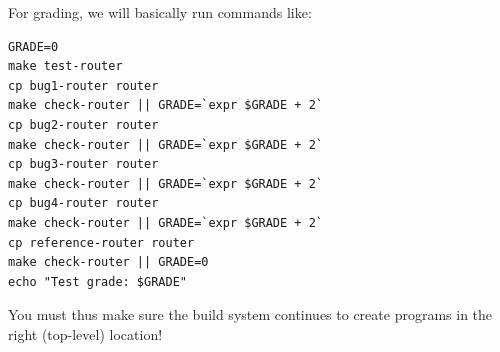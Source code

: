 \documentclass{article}
\begin{document}
For grading, we will basically run commands like:
\begin{verbatim}
GRADE=0
make test-router
cp bug1-router router
make check-router || GRADE=`expr $GRADE + 2`
cp bug2-router router
make check-router || GRADE=`expr $GRADE + 2`
cp bug3-router router
make check-router || GRADE=`expr $GRADE + 2`
cp bug4-router router
make check-router || GRADE=`expr $GRADE + 2`
cp reference-router router
make check-router || GRADE=0
echo "Test grade: $GRADE"
\end{verbatim}
You must thus make sure the build system continues to create programs in the
right (top-level) location!
\end{document}
